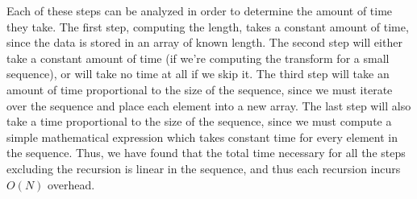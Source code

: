 \documentclass[11pt]{article}
\begin{document}
Each of these steps can be analyzed in order to determine the amount of time they take. The first
step, computing the length, takes a constant amount of time, since the data is stored in an array of
known length. The second step will either take a constant amount of time (if we're computing the
transform for a small sequence), or will take no time at all if we skip it. The third step will take
an amount of time proportional to the size of the sequence, since we must iterate over the sequence
and place each element into a new array. The last step will also take a time proportional to the
size of the sequence, since we must compute a simple mathematical expression which takes constant
time for every element in the sequence. Thus, we have found that the total time necessary for all
the steps excluding the recursion is linear in the sequence, and thus each recursion incurs $O(N)$
overhead.
\pagebreak

\onecolumn
\vspace*{0cm}
\end{document}
